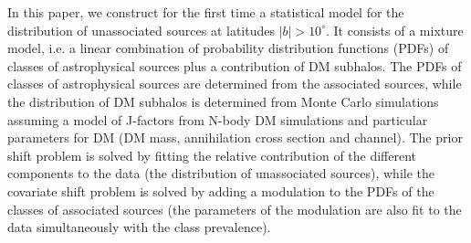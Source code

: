 \documentclass[12pt, a4paper]{article}
\begin{document}
In this paper, we construct for the first time a statistical model for the distribution of unassociated sources at latitudes $|b| > 10^\circ$. It consists of a mixture model, i.e. a linear combination of probability distribution functions (PDFs)
of classes of astrophysical sources plus a contribution of DM subhalos.
The PDFs of classes of astrophysical sources are determined from the associated sources, while the distribution of DM subhalos is determined from Monte Carlo simulations assuming a model of J-factors from N-body DM simulations and particular parameters for DM (DM mass, annihilation cross section and channel).
The prior shift problem is solved by fitting the relative contribution of the different components to the data (the distribution of unassociated sources), while the covariate shift problem is solved by adding a modulation to the PDFs of the classes of associated sources (the parameters of the modulation are also fit to the data simultaneously with the class prevalence).
\end{document}
